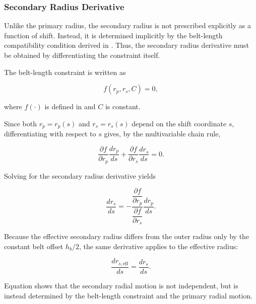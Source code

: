 \documentclass[11pt]{article}
\numberwithin{equation}{section}
\begin{document}
\subsubsection{Secondary Radius Derivative}
\label{sec:drsds}

Unlike the primary radius, the secondary radius is not prescribed explicitly
as a function of shift. Instead, it is determined implicitly by the
belt-length compatibility condition derived in . Thus,
the secondary radius derivative must be obtained by differentiating the
constraint itself.

The belt-length constraint is written as

\begin{equation}
f(r_p, r_s, C) = 0,
\label{eq:belt_constraint_general}
\end{equation}

where $f(\cdot)$ is defined in  and $C$ is constant.

Since both $r_p=r_p(s)$ and $r_s=r_s(s)$ depend on the shift coordinate $s$,
differentiating  with respect to $s$ gives,
by the multivariable chain rule,

\begin{equation}
\frac{\partial f}{\partial r_p}\frac{dr_p}{ds}
+
\frac{\partial f}{\partial r_s}\frac{dr_s}{ds}
= 0.
\label{eq:implicit_chain}
\end{equation}

Solving  for the secondary radius derivative yields

\begin{equation}
\frac{dr_s}{ds}
=
-
\frac{\dfrac{\partial f}{\partial r_p}}
{\dfrac{\partial f}{\partial r_s}}
\frac{dr_p}{ds}.
\label{eq:drsds_general}
\end{equation}

Because the effective secondary radius differs from the outer radius only by
the constant belt offset $h_b/2$, the same derivative applies to the effective
radius:

\begin{equation}
\frac{dr_{s,\mathrm{eff}}}{ds} = \frac{dr_s}{ds}.
\label{eq:drseffds}
\end{equation}

Equation  shows that the secondary radial motion is not
independent, but is instead determined by the belt-length constraint and the
primary radial motion.
\end{document}
